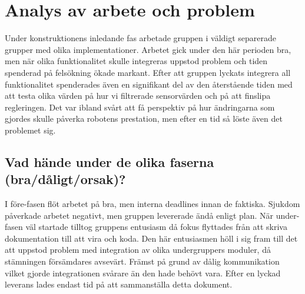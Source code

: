 \documentclass{article}
\begin{document}
\section{Analys av arbete och problem}
Under konstruktionens inledande fas arbetade gruppen i väldigt separerade grupper med olika implementationer. Arbetet gick under den här perioden bra, men när olika funktionalitet skulle integreras uppstod problem och tiden spenderad på felsökning ökade markant. Efter att gruppen lyckats integrera all funktionalitet spenderades även en signifikant del av den återstående tiden med att testa olika värden på hur vi filtrerade sensorvärden och på att finslipa regleringen. Det var ibland svårt att få perspektiv på hur ändringarna som gjordes skulle påverka robotens prestation, men efter en tid så löste även det problemet sig.

\subsection{Vad hände under de olika faserna (bra/dåligt/orsak)?}
I före-fasen flöt arbetet på bra, men interna deadlines innan de faktiska. Sjukdom påverkade arbetet negativt, men gruppen levererade ändå enligt plan. När under-fasen väl startade tilltog gruppens entusiasm då fokus flyttades från att skriva dokumentation till att vira och koda. Den här entusiasmen höll i sig fram till det att uppstod problem med integration av olika undergruppers moduler, då stämningen försämdares avsevärt. Främst på grund av dålig kommunikation vilket gjorde integrationen svårare än den hade behövt vara. Efter en lyckad leverans lades endast tid på att sammanställa detta dokument.
\end{document}
